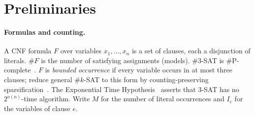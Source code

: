 \documentclass[11pt]{article}
\theoremstyle{definition}
\theoremstyle{remark}
\newcommand{\F}{F}
\newcommand{\cnt}{\#F}
\begin{document}
\section{Preliminaries}\label{sec:prelim}

\paragraph{Formulas and counting.} A CNF formula $\F$ over variables $x_1, \dots, x_n$ is a set of clauses, each a disjunction of literals. $\cnt$ is the number of satisfying assignments (models). \#3-SAT is \#P-complete~\citep{Val79}. $\F$ is \emph{bounded occurrence} if every variable occurs in at most three clauses; \citet{OpenAI26} reduce general \#$k$-SAT to this form by counting-preserving sparsification~\citep{IPZ01,CIP06}. The Exponential Time Hypothesis~\citep{IP01} asserts that 3-SAT has no $2^{o(n)}$-time algorithm. Write $M$ for the number of literal occurrences and $I_e$ for the variables of clause $e$.
\end{document}
